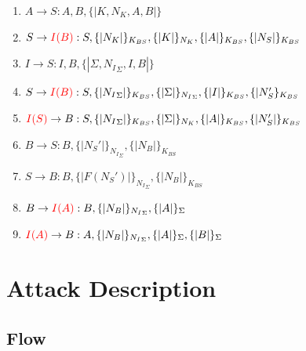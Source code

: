 \documentclass[11pt]{article}
\begin{document}
    \begin{enumerate}
        \item $A \rightarrow S : A, B, \{| K, N_K, A, B |\}$
        \item $S \rightarrow \textcolor{red}{I(B)} : S, \{|N_K|\}_{K_{BS}}, \{|K|\}_{N_K}, \{|A|\}_{K_{BS}}, \{|N_S|\}_{K_{BS}}$
        \item $I \rightarrow S : I, B, \{| \Sigma,  {N_I}_{\Sigma}, I, B |\}$
        \item $S \rightarrow \textcolor{red}{I(B)} : S, \{|{N_I}_{\Sigma}|\}_{K_{BS}}, \{|\Sigma|\}_{{N_I}_{\Sigma}}, \{|I|\}_{K_{BS}}, \{|N_S'\}_{K_{BS}}$
        \item $\textcolor{red}{I(S)} \rightarrow B : S, \{|{N_I}_{\Sigma}|\}_{K_{BS}}, \{|\Sigma|\}_{N_K}, \{|A|\}_{K_{BS}}, \{|N_S'|\}_{K_{BS}}$
        \item $B \rightarrow S : B, \{|N_S'|\}_{{N_I}_{\Sigma}}, \{|N_B|\}_{K_{BS}}$
        \item $S \rightarrow B : B, \{|F(N_S')|\}_{{N_I}_{\Sigma}}, \{|N_B|\}_{K_{BS}}$
        \item $B \rightarrow \textcolor{red}{I(A)} : B, \{|N_B|\}_{{N_I}_{\Sigma}}, \{|A|\}_{\Sigma}$
        \item $\textcolor{red}{I(A)} \rightarrow B  : A, \{|N_B|\}_{{N_I}_{\Sigma}}, \{|A|\}_{\Sigma}, \{|B|\}_{\Sigma}$

    \end{enumerate}

    \section{Attack Description}






    \subsection{Flow}
\end{document}
